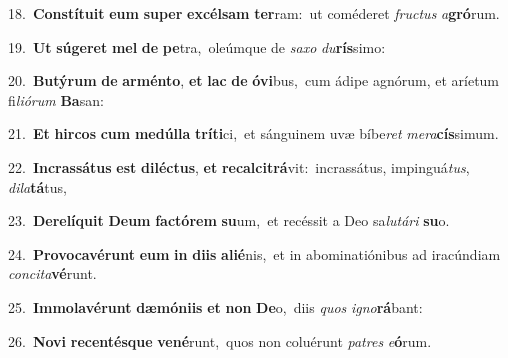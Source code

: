 {{\numbfont\textcolor{\numbcolor}{18.}}~\-\textbf{Con}\-\textbf{stí}\textbf{tu}\textbf{it} \textbf{e}\-\textbf{um} \textbf{su}\-\textbf{per} \textbf{ex}\-\textbf{cél}\textbf{sam} \textbf{ter}\-ram:~\star ut coméderet \textit{fruc}\-\textit{tus} \textit{a}\-\textbf{gró}rum.\par
{\numbfont\textcolor{\numbcolor}{19.}}~\textbf{Ut} \textbf{sú}\-\textbf{ge}\textbf{ret} \textbf{mel} \textbf{de} \textbf{pe}\-tra,~\star oleúmque de \textit{sa}\-\textit{xo} \textit{du}\-\textbf{rís}simo:\par
{\numbfont\textcolor{\numbcolor}{20.}}~\-\textbf{Bu}\-\textbf{tý}\textbf{rum} \textbf{de} \textbf{ar}\-\textbf{mén}\textbf{to}, \textbf{et} \textbf{lac} \textbf{de} \textbf{ó}\-\textbf{vi}bus,~\star cum ádipe agnórum, et aríetum fi\-\textit{li}\-\textit{ó}\textit{rum} \textbf{Ba}\-san:\par
{\numbfont\textcolor{\numbcolor}{21.}}~\textbf{Et} \textbf{hir}\-\textbf{cos} \textbf{cum} \textbf{me}\-\textbf{dúl}\textbf{la} \textbf{trí}\-\textbf{ti}ci,~\star et sánguinem uvæ bíbe\textit{ret} \textit{me}\-\textit{ra}\textbf{cís}simum.\par
{\numbfont\textcolor{\numbcolor}{22.}}~\-\textbf{In}\-\textbf{cras}\textbf{sá}\textbf{tus} \textbf{est} \textbf{di}\-\textbf{léc}\textbf{tus}, \textbf{et} \textbf{re}\-\textbf{cal}\textbf{ci}\textbf{trá}vit:~\star incrassátus, impinguá\-\textit{tus}\-, \textit{di}\-\textit{la}\textbf{tá}tus,\par
{\numbfont\textcolor{\numbcolor}{23.}}~\-\textbf{De}\-\textbf{re}\textbf{lí}\textbf{quit} \textbf{De}\-\textbf{um} \textbf{fac}\-\textbf{tó}\textbf{rem} \textbf{su}\-um,~\star et recéssit a Deo sa\-\textit{lu}\-\textit{tá}\textit{ri} \textbf{su}\-o.\par
{\numbfont\textcolor{\numbcolor}{24.}}~\-\textbf{Pro}\-\textbf{vo}\textbf{ca}\textbf{vé}\textbf{runt} \textbf{e}\-\textbf{um} \textbf{in} \textbf{di}\-\textbf{is} \textbf{a}\-\textbf{li}\textbf{é}nis,~\star et in abominatiónibus ad iracúndiam \textit{con}\-\textit{ci}\textit{ta}\textbf{vé}runt.\par
{\numbfont\textcolor{\numbcolor}{25.}}~\-\textbf{Im}\-\textbf{mo}\textbf{la}\textbf{vé}\textbf{runt} \textbf{dæ}\-\textbf{mó}\textbf{ni}\textbf{is} \textbf{et} \textbf{non} \textbf{De}\-o,~\star diis \textit{quos} \textit{i}\-\textit{gno}\textbf{rá}bant:\par
{\numbfont\textcolor{\numbcolor}{26.}}~\-\textbf{No}\-\textbf{vi} \textbf{re}\-\textbf{cen}\textbf{tés}\textbf{que} \textbf{ve}\-\textbf{né}runt,~\star quos non coluérunt \textit{pa}\-\textit{tres} \textit{e}\-\textbf{ó}rum.\par
}
